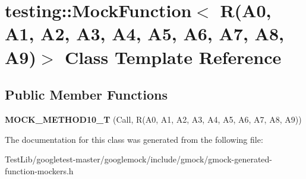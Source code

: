 \hypertarget{classtesting_1_1MockFunction_3_01R_07A0_00_01A1_00_01A2_00_01A3_00_01A4_00_01A5_00_01A6_00_01A7_00_01A8_00_01A9_08_4}{}\section{testing\+:\+:Mock\+Function$<$ R(A0, A1, A2, A3, A4, A5, A6, A7, A8, A9)$>$ Class Template Reference}
\label{classtesting_1_1MockFunction_3_01R_07A0_00_01A1_00_01A2_00_01A3_00_01A4_00_01A5_00_01A6_00_01A7_00_01A8_00_01A9_08_4}
\subsection*{Public Member Functions}
\begin{DoxyCompactItemize}
\item 
\mbox{\label{classtesting_1_1MockFunction_3_01R_07A0_00_01A1_00_01A2_00_01A3_00_01A4_00_01A5_00_01A6_00_01A7_00_01A8_00_01A9_08_4_adb493fcbb4936734eda9cf99b4d0acd0}} 
{\bfseries M\+O\+C\+K\+\_\+\+M\+E\+T\+H\+O\+D10\+\_\+T} (Call, R(A0, A1, A2, A3, A4, A5, A6, A7, A8, A9))
\end{DoxyCompactItemize}


The documentation for this class was generated from the following file\+:\begin{DoxyCompactItemize}
\item 
Test\+Lib/googletest-\/master/googlemock/include/gmock/gmock-\/generated-\/function-\/mockers.\+h\end{DoxyCompactItemize}
